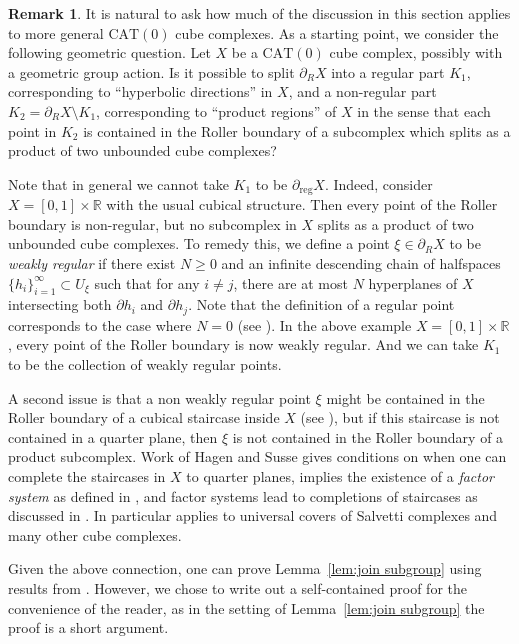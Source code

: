 \documentclass[JEP,XML,SOM,Unicode,NoFloatCountersInSection,published]{cedram}
\theoremstyle{plain}
\theoremstyle{definition}
\newtheorem{rk}[theo]{Remark}
\newcommand{\reg}{\mathrm{reg}}
\begin{document}
\begin{rk}
It is natural to ask how much of the discussion in this section applies to more general $\mathrm{CAT}(0)$ cube complexes. As a starting point, we consider the following geometric question.
Let $X$ be a $\mathrm{CAT}(0)$ cube complex, possibly with a geometric group action. Is it possible to split $\partial_R X$ into a regular part $K_1$, corresponding to ``hyperbolic directions'' in $X$, and a non-regular part $K_2=\partial_{R} X\setminus K_1$, corresponding to ``product regions'' of $X$ in the sense that each point in $K_2$ is contained in the Roller boundary of a subcomplex which splits as a product of two unbounded cube complexes?

Note that in general we cannot take $K_1$ to be $\partial_{\reg} X$. Indeed, consider $X=[0,1]\times \mathbb R$ with the usual cubical structure. Then every point of the Roller boundary is non-regular, but no subcomplex in $X$ splits as a product of two unbounded cube complexes. To remedy this, we define a point $\xi\in\partial_R X$ to be \emph{weakly regular} if there exist $N\ge 0$ and an infinite descending chain of halfspaces $\{h_i\}_{i=1}^\infty\subset U_\xi$ such that for any $i\neq j$, there are at most $N$ hyperplanes of $X$ intersecting both $\partial h_i$ and $\partial h_j$. Note that the definition of a regular point corresponds to the case where $N=0$ (see \cite[Prop.\,7.5]{Fer}).
In the above example $X=[0,1]\times\mathbb{R}$, every point of the Roller boundary is now weakly regular. And we can take $K_1$ to be the collection of weakly regular points.

A second issue is that a non weakly regular point $\xi$ might be contained in the Roller boundary of a cubical staircase inside $X$ (see \eg \cite[Fig.\,1]{hagen2020hierarchical}), but if this
staircase is not contained in a quarter plane, then $\xi$ is not contained in the Roller boundary of a product subcomplex. Work of Hagen and Susse \cite{hagen2020hierarchical} gives conditions on when one can complete the staircases in $X$ to quarter planes, \ie \cite[Th.\,A]{hagen2020hierarchical} implies the existence of a \emph{factor system} as defined in \cite[\S 1.2]{hagen2020hierarchical}, and factor systems lead to completions of staircases as discussed in \cite[\S 7]{hagen2020hierarchical}. In particular \cite[Th.\,A]{hagen2020hierarchical} applies to universal covers of Salvetti complexes and many other cube complexes.

Given the above connection, one can prove Lemma~\ref{lem:join subgroup} using results from \cite{hagen2020hierarchical}. However, we chose to write out a self-contained proof for the convenience of the reader, as in the setting of Lemma~\ref{lem:join subgroup} the proof is a short argument.
\end{rk}
\end{document}
